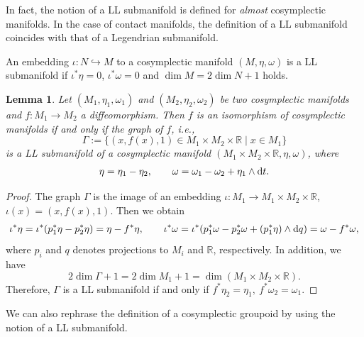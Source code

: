 \documentclass[10pt,a4paper]{amsart}
\numberwithin{equation}{section}
\newtheorem{Lemma}[Theorem]{Lemma}
\begin{document}
In fact, the notion of a LL submanifold is defined for \textit{almost} cosymplectic manifolds. In the case of contact manifolds, the definition of a LL submanifold coincides with that of a Legendrian submanifold.

\begin{Remark}
 An embedding $\iota\colon N\hookrightarrow M$ to a cosymplectic manifold $(M,\eta,\omega)$ is a LL sub\-mani\-fold if $\iota^\ast\eta=0$, $\iota^\ast\omega=0$ and $\dim M=2\dim N+1$ holds.
\end{Remark}

\begin{Lemma}
 Let $(M_1,\eta_1,\omega_1)$ and $(M_2,\eta_2,\omega_2)$ be two cosymplectic manifolds and $f\colon M_1\to M_2$ a diffeomorphism. Then $f$ is an isomorphism of cosymplectic manifolds if and only if the graph of $f$, i.e.,
 \[\Gamma:=\{(x,f(x),1)\in M_1\times M_2\times\mathbb{R}\mid x\in M_1\}\]
 is a LL submanifold of a cosymplectic manifold $(M_1\times M_2\times\mathbb{R},\eta,\omega)$, where
 \[\eta=\eta_1-\eta_2,\qquad\omega=\omega_1-\omega_2+\eta_1\wedge {\rm d}t.\]
\end{Lemma}
\begin{proof}
 The graph $\Gamma$ is the image of an embedding
 $\iota\colon M_1\to M_1\times M_2\times\mathbb{R}$, $\iota(x)=(x,f(x),1)$. Then we obtain
 \begin{gather*}
 \iota^\ast{\eta}=\iota^\ast(p_1^\ast\eta-p_2^\ast\eta)=\eta-f^\ast\eta,\qquad
 \iota^\ast{\omega}=\iota^\ast(p_1^\ast\omega-p_2^\ast\omega+(p_1^\ast\eta)\wedge {\rm d}q)=\omega-f^\ast\omega,
 \end{gather*}
 where $p_i$ and $q$ denotes projections to $M_i$ and $\mathbb{R}$, respectively. In addition, we have
 \[2\dim\Gamma+1=2\dim M_1+1=\dim(M_1\times M_2\times\mathbb{R}).\]
 Therefore, $\Gamma$ is a LL submanifold if and only if $f^\ast\eta_2=\eta_1,\ f^\ast\omega_2=\omega_1$.
\end{proof}

We can also rephrase the definition of a cosymplectic groupoid by using the notion of a LL submanifold.
\end{document}
